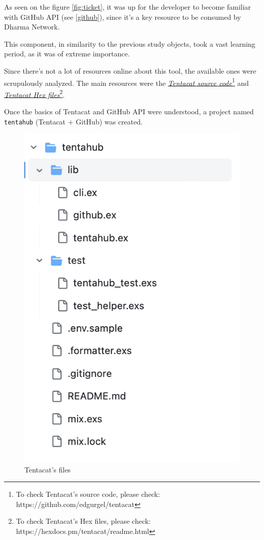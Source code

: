 As seen on the figure \ref{fig:ticket}, it was up for the developer to become familiar with GitHub API (see \ref{github}), since it's a key resource to be consumed by Dharma Network.

This component, in similarity to the previous study objects, took a vast learning period, as it was of extreme importance.\newline

Since there's not a lot of resources online about this tool, the available ones were scrupulously analyzed. The main resources were the \href{https://github.com/edgurgel/tentacat}{\textit{Tentacat source code}}\footnote{To check Tentacat's source code, please check: https://github.com/edgurgel/tentacat} and \href{https://hexdocs.pm/tentacat/readme.html}{\textit{Tentacat Hex files}}\footnote{To check Tentacat's Hex files, please check: https://hexdocs.pm/tentacat/readme.html}. \newline

Once the basics of Tentacat and GitHub API were understood, a project named \texttt{tentahub} (Tentacat + GitHub) was created.

\begin{figure}[htbp]
	\centering
	\includegraphics[scale=0.5]{figures/tentahub.png}  %
	\caption{Tentacat's files}
	\label{fig:tent}
\end{figure}

